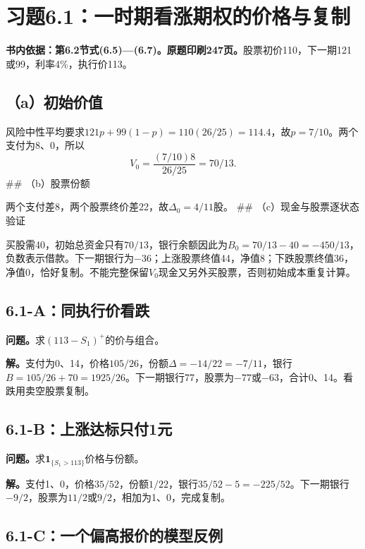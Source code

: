 \documentclass[11pt,a4paper,UTF8,fontset=fandol]{ctexart}
\begin{document}
\clearpage

\section{习题6.1：一时期看涨期权的价格与复制}\label{ux4e60ux98986.1ux4e00ux65f6ux671fux770bux6da8ux671fux6743ux7684ux4ef7ux683cux4e0eux590dux5236}

\textbf{书内依据：第6.2节式(6.5)---(6.7)。原题印刷247页。}股票初价110，下一期121或99，利率4\%，执行价113。

\subsection{（a）初始价值}\label{aux521dux59cbux4ef7ux503c}

风险中性平均要求\(121p+99(1-p)=110(26/25)=114.4\)，故\(p=7/10\)。两个支付为8、0，所以
\[\boxed{V_0=\frac{(7/10)8}{26/25}=70/13.}\] \#\# （b）股票份额

两个支付差8，两个股票终价差22，故\(\boxed{\Delta_0=4/11}\)股。 \#\#
（c）现金与股票逐状态验证

买股需40，初始总资金只有\(70/13\)，银行余额因此为\(B_0=70/13-40=-450/13\)，负数表示借款。下一期银行为\(-36\)；上涨股票终值44，净值8；下跌股票终值36，净值0，恰好复制。不能完整保留\(V_0\)现金又另外买股票，否则初始成本重复计算。

\subsection{6.1-A：同执行价看跌}\label{aux540cux6267ux884cux4ef7ux770bux8dcc}

\textbf{问题。}求\((113-S_1)^+\)的价与组合。

\textbf{解。}支付为0、14，价格\(\boxed{105/26}\)，份额\(\Delta=-14/22=-7/11\)，银行\(B=105/26+70=1925/26\)。下一期银行77，股票为\(-77\)或\(-63\)，合计0、14。看跌用卖空股票复制。

\subsection{6.1-B：上涨达标只付1元}\label{bux4e0aux6da8ux8fbeux6807ux53eaux4ed81ux5143}

\textbf{问题。}求\(\mathbf1_{\{S_1>113\}}\)价格与份额。

\textbf{解。}支付1、0，价格\(\boxed{35/52}\)，份额\(1/22\)，银行\(35/52-5=-225/52\)。下一期银行\(-9/2\)，股票为\(11/2\)或\(9/2\)，相加为1、0，完成复制。

\subsection{6.1-C：一个偏高报价的模型反例}\label{cux4e00ux4e2aux504fux9ad8ux62a5ux4ef7ux7684ux6a21ux578bux53cdux4f8b}
\end{document}
